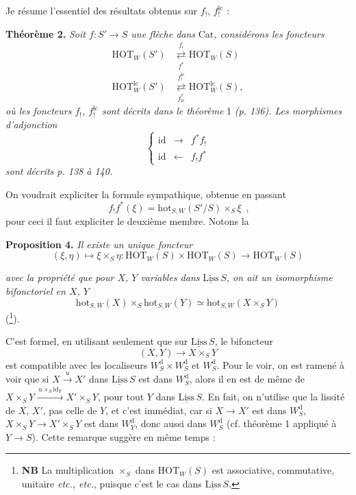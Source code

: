 \documentclass[11pt]{article}
\newcommand{\printedpage}[1]{\marginpar{\footnotesize p.~#1}}
\newcommand{\msp}[1]{\marginpar{\footnotesize [#1]}}
\newcommand{\HOT}{\mathrm{HOT}}
\newcommand{\hot}{\mathrm{hot}}
\newcommand{\Cat}{\mathrm{Cat}}
\newcommand{\id}{\mathrm{id}}
\newcommand{\Liss}{\underline{\mathrm{Liss}}\,}
\newcommand{\dd}{\mathrm{d}}
\newcommand{\lc}{\mathrm{lc}}
\newcommand{\adj}[2]{\mathrel{\underset{#2}{\overset{#1}{\rightleftarrows}}}}
\begin{document}
Je résume l'essentiel des résultats obtenus sur $f_!$, $f_!^{\lc}$ :

\textbf{Théorème 2.} \textit{Soit $f : S' \longrightarrow S$ une flèche dans} $\Cat$\textit{, considérons les foncteurs}
\[
\begin{aligned}
\HOT_W(S') &\adj{f_!}{f^*} \HOT_W(S) \\
\HOT^{\lc}_W(S') &\adj{f_!^{\lc}}{f^*_{\lc}} \HOT^{\lc}_W(S),
\end{aligned}
\]
\msp{page 151}
\textit{où les foncteurs $f_!$, $f_!^{\lc}$ sont décrits dans le théorème} 1 \textit{(p. 136). Les morphismes d'adjonction}
\[
\left\{
\begin{array}{lcl}
\id & \longrightarrow & f^*f_! \\[1ex]
\id & \longleftarrow & f_!f^*
\end{array}
\right.
\]
\textit{sont décrits p. 138 à 140.}

On voudrait expliciter la formule sympathique, obtenue en passant
\[
\boxed{\;f_!f^*(\xi) = \hot_{S,W}(S'/S) \times_S \xi\;}\ ,
\]
pour ceci il faut expliciter le deuxième membre. Notons la

\textbf{Proposition 4.} \textit{Il existe un unique foncteur}
\[
(\xi, \eta) \longmapsto \xi \times_S \eta : \HOT_W(S) \times \HOT_W(S) \longrightarrow \HOT_W(S)
\]


\printedpage{93}

\textit{avec la propriété que pour $X$, $Y$ variables dans} $\Liss S$\textit{, on ait un isomorphisme bifonctoriel en $X$, $Y$}
\[
\hot_{S,W}(X) \times_S \hot_{S,W}(Y) \simeq \hot_{S,W}(X \times_S Y)
\tag*{$(*)$}
\]
(\footnote[72]{\textbf{NB} La multiplication $\times_S$ dans $\HOT_W(S)$ est associative, commutative, unitaire \textit{etc., etc.}, puisque c'est le cas dans $\Liss S$.}).

C'est formel, en utilisant seulement que sur $\Liss S$, le bifoncteur
\[
(X, Y) \longrightarrow X \times_S Y
\]
est compatible avec les localiseurs $W^{\dd}_S \times W^{\dd}_S$ et $W^{\dd}_S$. Pour le voir, on est ramené à voir que si $X \xrightarrow{u} X'$ dans $\Liss S$ est dans $W^{\dd}_S$, alors il en est de même de $X \times_S Y \xrightarrow{\ u\times_S \id_Y\ } X' \times_S Y$, pour tout
\msp{page 152}
$Y$ dans $\Liss S$. En fait, on n'utilise que la lissité de $X$, $X'$, pas celle de $Y$, et c'est immédiat, car si $X \longrightarrow X'$ est dans $W^{\dd}_S$, $X \times_S Y \longrightarrow X' \times_S Y$ est dans $W^{\dd}_Y$, donc aussi dans $W^{\dd}_S$ (cf. théorème 1 appliqué à $Y \longrightarrow S$). Cette remarque suggère en même temps :
\end{document}

